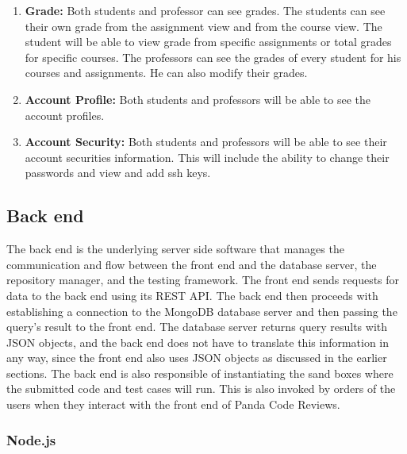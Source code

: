 \begin{enumerate}
\item \textbf{Grade:} Both students and professor can see grades. The students
can see their own grade from the assignment view and from the course view. The
student will be able to view grade from specific assignments or total grades
for specific courses. The professors can see the grades of every student for
his courses and assignments. He can also modify their grades.

\item \textbf{Account Profile:} Both students and professors will be able to
see the account profiles.

\item \textbf{Account Security:} Both students and professors will be able to
see their account securities information. This will include the ability to
change their passwords and view and add ssh keys.


\end{enumerate}

\subsection{Back end}

The back end is the underlying server side software that manages the
communication and flow between the front end and the database server, the
repository manager, and the testing framework. The front end sends requests for
data to the back end using its REST API. The back end then proceeds with
establishing a connection to the MongoDB database server and then passing the
query's result to the front end. The database server returns query results with
JSON objects, and the back end does not have to translate this information in
any way, since the front end also uses JSON objects as discussed in the earlier
sections. The back end is also responsible of instantiating the sand boxes where
the submitted code and test cases will run. This is also invoked by orders of
the users when they interact with the front end of Panda Code Reviews.


\subsubsection{Node.js}


